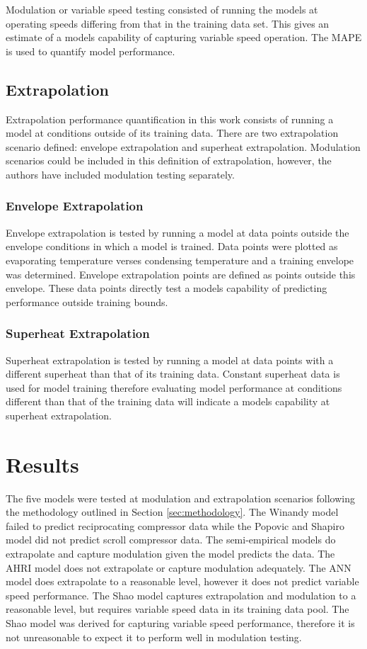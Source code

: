 \documentclass[preprint,11pt,authoryear]{elsarticle}
\begin{document}
Modulation or variable speed testing consisted of running the models at operating speeds differing from that in the training data set. This gives an estimate of a models capability of capturing variable speed operation. The MAPE is used to quantify model performance. 

\subsection{Extrapolation}

Extrapolation performance quantification in this work consists of running a model at conditions outside of its training data. There are two extrapolation scenario defined: envelope extrapolation and superheat extrapolation. Modulation scenarios could be included in this definition of extrapolation, however, the authors have included modulation testing separately. 

\subsubsection{Envelope Extrapolation}

Envelope extrapolation is tested by running a model at data points outside the envelope conditions in which a model is trained. Data points were plotted as evaporating temperature verses condensing temperature and a training envelope was determined. Envelope extrapolation points are defined as points outside this envelope. These data points directly test a models capability of predicting performance outside training bounds. 

\subsubsection{Superheat Extrapolation}

Superheat extrapolation is tested by running a model at data points with a different superheat than that of its training data. Constant superheat data is used for model training therefore evaluating model performance at conditions different than that of the training data will indicate a models capability at superheat extrapolation. 
 
\section{Results}

The five models were tested at modulation and extrapolation scenarios following the methodology outlined in Section \ref{sec:methodology}. The Winandy model failed to predict reciprocating compressor data while the Popovic and Shapiro model did not predict scroll compressor data. The semi-empirical models do extrapolate and capture modulation given the model predicts the data. The AHRI model does not extrapolate or capture modulation adequately. The ANN model does extrapolate to a reasonable level, however it does not predict variable speed performance. The Shao model captures extrapolation and modulation to a reasonable level, but requires variable speed data in its training data pool. The Shao model was derived for capturing variable speed performance, therefore it is not unreasonable to expect it to perform well in modulation testing.
\end{document}
